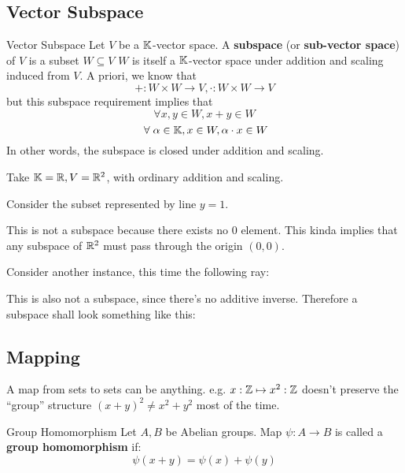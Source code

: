\subsection{Vector Subspace}
\begin{definition} {Vector Subspace}
    Let \(V\) be a \(\mathbb{K}\)-vector space. A \textbf{subspace} (or \textbf{sub-vector space}) of \(V\) is a subset \(W \subseteq V\) \st \(W\) is itself a \(\mathbb{K}\)-vector space under addition and scaling induced from \(V\). A priori, we know that \[
        + : W \times W \to V, \cdot: W \times W \to V
    \]
    but this subspace requirement implies that
    \[
        \forall x, y \in W, x+y \in W
    \]
    \[
        \forall \alpha \in \bbk, x \in W, \alpha \cdot x \in W
    \]
    In other words, the subspace is closed under addition and scaling.
\end{definition}

\begin{example}
    Take \(\mathbb{K} = \mathbb{R}, V = \mathbb{R}^2\), with ordinary addition and scaling.

    Consider the subset represented by line \(y = 1\).
    

    This is not a subspace because there exists no 0 element. This kinda implies that any subspace of \(\mathbb{R}^2\) must pass through the origin \((0, 0)\).

    Consider another instance, this time the following ray:
    
    This is also not a subspace, since there's no additive inverse. Therefore a subspace shall look something like this:
    
\end{example}
\subsection{Mapping}
\begin{motivation}
    A map from sets to sets can be anything. e.g. \(x:\mathbb{Z} \mapsto x^2:\mathbb{Z}\) doesn't preserve the ``group'' structure \((x+y) ^2 \neq x^2 + y^2\) most of the time.
\end{motivation}

\begin{definition} {Group Homomorphism}
    Let \(A, B\) be Abelian groups. Map \(\psi: A \to B\) is called a \textbf{group homomorphism} if: \[
        \psi (x + y) = \psi (x) + \psi (y)
    \]
\end{definition}

